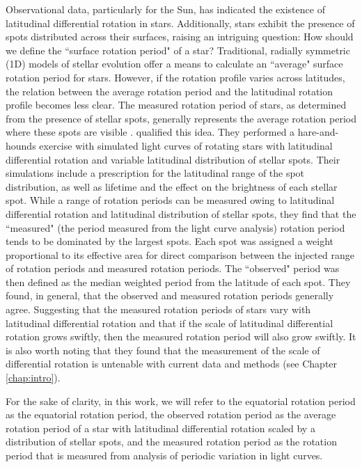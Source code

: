 Observational data, particularly for the Sun, has indicated the existence of latitudinal differential rotation in stars. Additionally, stars exhibit the presence of spots distributed across their surfaces, raising an intriguing question: How should we define the ``surface rotation period" of a star?
Traditional, radially symmetric (1D) models of stellar evolution offer a means to calculate an ``average" surface rotation period for stars. However, if the rotation profile varies across latitudes, the relation between the average rotation period and the latitudinal rotation profile becomes less clear.
The measured rotation period of stars, as determined from the presence of stellar spots, generally represents the average rotation period where these spots are visible \citep{santos_surface_2021}.
\citet{aigrain_hare_2015} qualified this idea.
They performed a hare-and-hounds exercise with simulated light curves of rotating stars with latitudinal differential rotation and variable latitudinal distribution of stellar spots.
Their simulations include a prescription for the latitudinal range of the spot distribution, as well as lifetime and the effect on the brightness of each stellar spot.
While a range of rotation periods can be measured owing to latitudinal differential rotation and latitudinal distribution of stellar spots, they find that the ``measured" (the period measured from the light curve analysis) rotation period tends to be dominated by the largest spots.
Each spot was assigned a weight proportional to its effective area for direct comparison between the injected range of rotation periods and measured rotation periods.
The ``observed" period was then defined as the median weighted period from the latitude of each spot.
They found, in general, that the observed and measured rotation periods generally agree.
Suggesting that the measured rotation periods of stars vary with latitudinal differential rotation and that if the scale of latitudinal differential rotation grows swiftly, then the measured rotation period will also grow swiftly.
It is also worth noting that they found that the measurement of the scale of differential rotation is untenable with current data and methods (see Chapter \ref{chap:intro}).

For the sake of clarity, in this work, we will refer to the equatorial rotation period as the equatorial rotation period, the observed rotation period as the average rotation period of a star with latitudinal differential rotation scaled by a distribution of stellar spots, and the measured rotation period as the rotation period that is measured from analysis of periodic variation in light curves.

